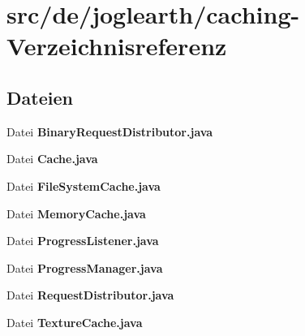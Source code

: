 \section{src/de/joglearth/caching-\/\-Verzeichnisreferenz}
\label{dir_966871c485964458ebc4d074d4ab0610}
\subsection*{Dateien}
\begin{DoxyCompactItemize}
\item 
Datei {\bfseries Binary\-Request\-Distributor.\-java}
\item 
Datei {\bfseries Cache.\-java}
\item 
Datei {\bfseries File\-System\-Cache.\-java}
\item 
Datei {\bfseries Memory\-Cache.\-java}
\item 
Datei {\bfseries Progress\-Listener.\-java}
\item 
Datei {\bfseries Progress\-Manager.\-java}
\item 
Datei {\bfseries Request\-Distributor.\-java}
\item 
Datei {\bfseries Texture\-Cache.\-java}
\end{DoxyCompactItemize}
